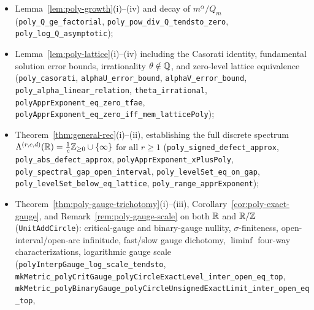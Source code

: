 \begin{itemize}[leftmargin=1.8em]
\item Lemma~\ref{lem:poly-growth}(i)--(iv) and decay of $m^\alpha/Q_m$
(\texttt{poly\_\allowbreak Q\_\allowbreak ge\_\allowbreak factorial},
\texttt{poly\_\allowbreak pow\_\allowbreak div\_\allowbreak Q\_\allowbreak tendsto\_\allowbreak zero},
\texttt{poly\_\allowbreak log\_\allowbreak Q\_\allowbreak asymptotic});
\item Lemma~\ref{lem:poly-lattice}(i)--(iv) including the Casorati identity,
fundamental solution error bounds, irrationality $\theta\notin\mathbb{Q}$, and
zero-level lattice equivalence
(\texttt{poly\_\allowbreak casorati},
\texttt{alphaU\_\allowbreak error\_\allowbreak bound},
\texttt{alphaV\_\allowbreak error\_\allowbreak bound},
\texttt{poly\_\allowbreak alpha\_\allowbreak linear\_\allowbreak relation},
\texttt{theta\_\allowbreak irrational},
\texttt{polyApprExponent\_\allowbreak eq\_\allowbreak zero\_\allowbreak tfae},
\texttt{polyApprExponent\_\allowbreak eq\_\allowbreak zero\_\allowbreak iff\_\allowbreak mem\_\allowbreak latticePoly});
\item Theorem~\ref{thm:general-rec}(i)--(ii), establishing the full discrete
spectrum $\Lambda^{(r,c,d)}(\mathbb{R})=\frac{1}{c}\mathbb{Z}_{\ge0}\cup\{\infty\}$ for all
$r\ge1$
(\texttt{poly\_\allowbreak signed\_\allowbreak defect\_\allowbreak approx},
\texttt{poly\_\allowbreak abs\_\allowbreak defect\_\allowbreak approx},
\texttt{polyApprExponent\_\allowbreak xPlusPoly},
\texttt{poly\_\allowbreak spectral\_\allowbreak gap\_\allowbreak open\_\allowbreak interval},
\texttt{poly\_\allowbreak levelSet\_\allowbreak eq\_\allowbreak on\_\allowbreak gap},
\texttt{poly\_\allowbreak levelSet\_\allowbreak below\_\allowbreak eq\_\allowbreak lattice},
\texttt{poly\_\allowbreak range\_\allowbreak apprExponent});
\item Theorem~\ref{thm:poly-gauge-trichotomy}(i)--(iii),
Corollary~\ref{cor:poly-exact-gauge}, and Remark~\ref{rem:poly-gauge-scale} on
both $\mathbb{R}$ and $\mathbb{R}/\mathbb{Z}$ (\texttt{UnitAddCircle}): critical-gauge and
binary-gauge nullity, $\sigma$-finiteness, open-interval/open-arc infinitude,
fast/slow gauge dichotomy, $\liminf$ four-way characterizations, logarithmic
gauge scale (\texttt{polyInterpGauge\_\allowbreak log\_\allowbreak scale\_\allowbreak tendsto},
\texttt{mkMetric\_\allowbreak polyCritGauge\_\allowbreak polyCircleExactLevel\_\allowbreak inter\_\allowbreak open\_\allowbreak eq\_\allowbreak top},
\texttt{mkMetric\_\allowbreak polyBinaryGauge\_\allowbreak polyCircleUnsignedExactLimit\_\allowbreak inter\_\allowbreak open\_\allowbreak eq\_\allowbreak top},

\end{itemize}
